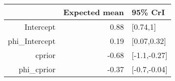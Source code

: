 \begin{tabular}{rrl}
  \hline
 & Expected mean & 95\% CrI \\ 
  \hline
Intercept & 0.88 & [0.74,1] \\ 
  phi\_Intercept & 0.19 & [0.07,0.32] \\ 
  cprior & -0.68 & [-1.1,-0.27] \\ 
  phi\_cprior & -0.37 & [-0.7,-0.04] \\ 
   \hline
\end{tabular}

